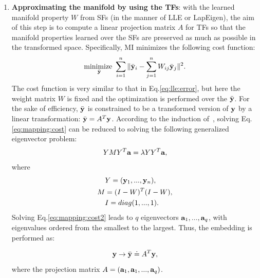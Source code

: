 \documentclass[10pt,twocolumn,letterpaper]{article}
\begin{document}
\begin{enumerate} [leftmargin=4.5mm]
\begin{enumerate} [leftmargin=5mm]
   \end{enumerate}

 \item \textbf{Approximating the manifold by using the TFs}: with the
   learned manifold property $W$ from SFs (in the manner of LLE or
   LapEigen), the aim of this step is to compute a linear projection
   matrix $A$ for TFs so that the manifold properties learned over the
   SFs are preserved as much as possible in the transformed space. 
   Specifically, MI minimizes the following cost
   function:
   \begin{equation}
     \label{eq:mapping:cost}
         \begin{aligned}
         \underset{\bar{{\mathbf y}}} {\text {minimize }}  \sum_{i=1}^n  \| \bar{{\mathbf y}}_i - \sum_{j=1}^n W_{ij} \bar{{\mathbf y}}_j \|^2. \\
         \end{aligned}
   \end{equation}
   The cost function is very similar to that in Eq.\ref{eq:lle:error},
   but here the weight matrix $W$ is fixed and the optimization is
   performed over the $\bar{{\mathbf y}}$. For the sake of efficiency,
   $\bar{{\mathbf y}}$ is constrained to be a transformed version of
   ${{\mathbf y}}$ by a linear transformation: $\bar{{\mathbf y}} = A^T{{\mathbf y}}$.
According to the induction of~\cite{NPEmbedding:iccv05}, solving Eq.\ref{eq:mapping:cost} can be reduced to solving
   the following generalized eigenvector problem:
   \begin{equation}
     \label{eq:mapping:cost2}
         \begin{aligned}
           YMY^T {\mathbf a} = \lambda YY^T {\mathbf a},
         \end{aligned}
   \end{equation}
   where  
 \begin{align*}
     & Y = ({{\mathbf y}}_1, ..., {{\mathbf y}}_n), \\
     M &= (I-W)^T (I-W),   \\
     &I = diag(1, ..., 1).  
\end{align*}
Solving Eq.\ref{eq:mapping:cost2} leads to $q$ eigenvectors
${\mathbf a}_1, ..., {\mathbf a}_q$, with eigenvalues ordered from the
smallest to the largest.  Thus, the embedding is performed as:

\begin{equation}
  \label{eq:embedding}
  {{\mathbf y}} \to \bar{{\mathbf y}} \doteq A^T {{\mathbf y}}, 
\end{equation}
where the projection matrix $A = ({\mathbf a}_1, {\mathbf a}_1, ...,
{\mathbf a}_{q})$.
\end{enumerate}
\end{document}
